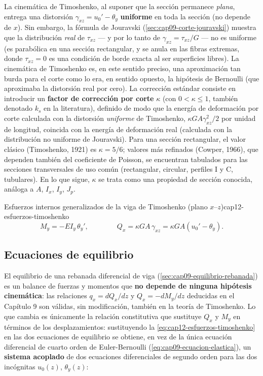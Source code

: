 \begin{observacion}
La cinemática de Timoshenko, al suponer que la sección permanece \emph{plana}, entrega una distorsión $\gamma_{xz}=u_0'-\theta_y$ \textbf{uniforme} en toda la sección (no depende de $x$). Sin embargo, la fórmula de Jouravski (\cref{sec:cap09-corte-jouravski}) muestra que la distribución \emph{real} de $\tau_{xz}$ --- y por lo tanto de $\gamma_{xz}=\tau_{xz}/G$ --- no es uniforme (es parabólica en una sección rectangular, y se anula en las fibras extremas, donde $\tau_{xz}=0$ es una condición de borde exacta al ser superficies libres). La cinemática de Timoshenko es, en este sentido preciso, una aproximación tan burda para el corte como lo era, en sentido opuesto, la hipótesis de Bernoulli (que aproximaba la distorsión real por cero). La corrección estándar consiste en introducir un \textbf{factor de corrección por corte} $\kappa$ (con $0<\kappa\leq1$, también denotado $k_s$ en la literatura), definido de modo que la energía de deformación por corte calculada con la distorsión \emph{uniforme} de Timoshenko, $\kappa GA\gamma_{xz}^2/2$ por unidad de longitud, coincida con la energía de deformación real (calculada con la distribución no uniforme de Jouravski). Para una sección rectangular, el valor clásico (Timoshenko, 1921) es $\kappa=5/6$; valores más refinados (Cowper, 1966), que dependen también del coeficiente de Poisson, se encuentran tabulados para las secciones transversales de uso común (rectangular, circular, perfiles I y C, tubulares). En lo que sigue, $\kappa$ se trata como una propiedad de sección conocida, análoga a $A$, $I_x$, $I_y$, $J_p$.
\end{observacion}

\begin{ecnimportante}{Esfuerzos internos generalizados de la viga de Timoshenko (plano \texorpdfstring{$x$--$z$}{x-z})}{cap12-esfuerzos-timoshenko}
\[
M_y = -EI_y\,\theta_y', \qquad\qquad Q_x = \kappa GA\,\gamma_{xz} = \kappa GA\left(u_0'-\theta_y\right) .
\]
\end{ecnimportante}

\subsection{Ecuaciones de equilibrio}

El equilibrio de una rebanada diferencial de viga (\cref{sec:cap09-equilibrio-rebanada}) es un balance de fuerzas y momentos que \textbf{no depende de ninguna hipótesis cinemática}: las relaciones $q_x=dQ_x/dz$ y $Q_x=-dM_y/dz$ deducidas en el Capítulo 9 son válidas, sin modificación, también en la teoría de Timoshenko. Lo que cambia es únicamente la relación constitutiva que sustituye $Q_x$ y $M_y$ en términos de los desplazamientos: sustituyendo la \cref{eq:cap12-esfuerzos-timoshenko} en las dos ecuaciones de equilibrio se obtiene, en vez de la única ecuación diferencial de cuarto orden de Euler-Bernoulli (\cref{eq:cap09-ecuacion-elastica}), un \textbf{sistema acoplado} de dos ecuaciones diferenciales de segundo orden para las dos incógnitas $u_0(z)$, $\theta_y(z)$:


